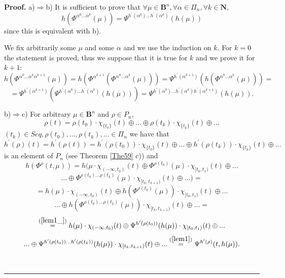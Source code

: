 \documentclass[12pt]{article}\usepackage{amsmath}
\newenvironment{proof}[1][Proof]{\textbf{#1.} }{\ \rule{0.5em}{0.5em}}
\begin{document}
\begin{proof}
a)$\Longrightarrow$b) It is sufficient to prove that $\forall\mu\in
\mathbf{B}^{n},\forall\alpha\in\Pi_{n},\forall k\in\mathbf{N},$\begin{equation}
h(\Phi^{\alpha^{0}...\alpha^{k}}(\mu))=\Psi^{h^{\prime}(\alpha^{0})...h^{\prime}(\alpha^{k})}(h(\mu)) \label{lem1_}\end{equation}
since this is equivalent with b).

We fix arbitrarily some $\mu$ and some $\alpha$ and we use the induction on
$k$. For $k=0$ the statement is proved, thus we suppose that it is true for
$k$ and we prove it for $k+1$:\[
h(\Phi^{\alpha^{0}...\alpha^{k}\alpha^{k+1}}(\mu))=h(\Phi^{\alpha^{k+1}}(\Phi^{\alpha^{0}...\alpha^{k}}(\mu)))=\Psi^{h^{\prime}(\alpha^{k+1})}(h(\Phi^{\alpha^{0}...\alpha^{k}}(\mu)))=
\]\[
=\Psi^{h^{\prime}(\alpha^{k+1})}(\Psi^{h^{\prime}(\alpha^{0})...h^{\prime
}(\alpha^{k})}(h(\mu)))=\Psi^{h^{\prime}(\alpha^{0})...h^{\prime}(\alpha
^{k})h^{\prime}(\alpha^{k+1})}(h(\mu)).
\]


b)$\Longrightarrow$c) For arbitrary $\mu\in\mathbf{B}^{n}$ and $\rho\in
P_{n},$\[
\rho(t)=\rho(t_{0})\cdot\chi_{\{t_{0}\}}(t)\oplus...\oplus\rho(t_{k})\cdot
\chi_{\{t_{k}\}}(t)\oplus...
\]
$(t_{k})\in Seq,\rho(t_{0}),...,\rho(t_{k}),...\in\Pi_{n}$ we have that\begin{equation}
h^{\prime}(\rho)(t)=h^{\prime}(\rho(t))=h^{\prime}(\rho(t_{0}))\cdot
\chi_{\{t_{0}\}}(t)\oplus...\oplus h^{\prime}(\rho(t_{k}))\cdot\chi
_{\{t_{k}\}}(t)\oplus... \label{lem1}\end{equation}
is an element of $P_{n}$ (see Theorem \ref{The59} c)) and\[
h(\Phi^{\rho}(t,\mu))=h(\mu\cdot\chi_{(-\infty,t_{0})}(t)\oplus\Phi
^{\rho(t_{0})}(\mu)\cdot\chi_{\lbrack t_{0},t_{1})}(t)\oplus...
\]\[
...\oplus\Phi^{\rho(t_{0})...\rho(t_{k})}(\mu)\cdot\chi_{\lbrack t_{k},t_{k+1})}(t)\oplus...)=
\]\[
=h(\mu)\cdot\chi_{(-\infty,t_{0})}(t)\oplus h(\Phi^{\rho(t_{0})}(\mu
))\cdot\chi_{\lbrack t_{0},t_{1})}(t)\oplus...
\]\[
...\oplus h(\Phi^{\rho(t_{0})...\rho(t_{k})}(\mu))\cdot\chi_{\lbrack
t_{k},t_{k+1})}(t)\oplus...=
\]\[
\overset{(\ref{lem1_})}{=}h(\mu)\cdot\chi_{(-\infty,t_{0})}(t)\oplus
\Psi^{h^{\prime}(\rho(t_{0}))}(h(\mu))\cdot\chi_{\lbrack t_{0},t_{1})}(t)\oplus...
\]\[
...\oplus\Psi^{h^{\prime}(\rho(t_{0}))...h^{\prime}(\rho(t_{k}))}(h(\mu
))\cdot\chi_{\lbrack t_{k},t_{k+1})}(t)\oplus...\overset{(\ref{lem1})}{=}\Psi^{h^{\prime}(\rho)}(t,h(\mu)).
\]



\end{proof}
\end{document}
